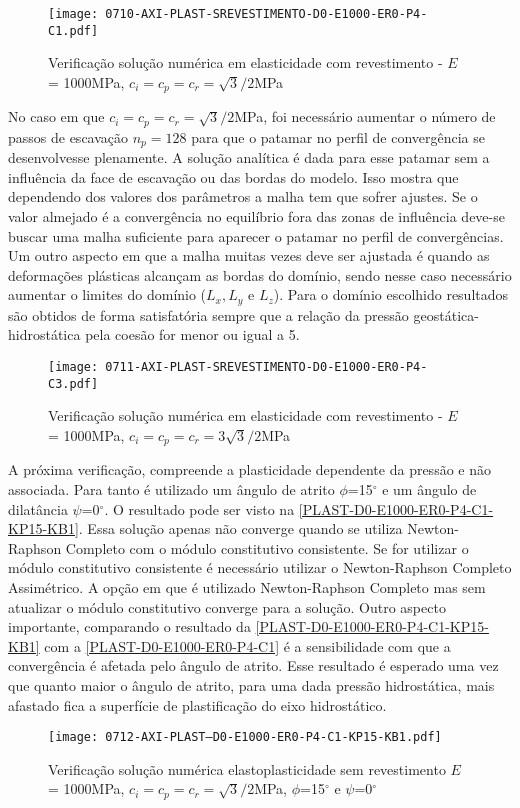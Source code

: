 \begin{figure}[H]
	\begin{center}
		\texttt{[image: 0710-AXI-PLAST-SREVESTIMENTO-D0-E1000-ER0-P4-C1.pdf]}
	\end{center}
	\caption{\label{PLAST-D0-E1000-ER0-P4-C1}Verificação solução numérica em elasticidade com revestimento - $E$ = 1000MPa,  $c_i=c_p=c_r = \sqrt{3}/2$MPa}
\end{figure}
No caso em que $c_i=c_p=c_r = \sqrt{3}/2$MPa, foi necessário aumentar o número de passos de escavação $n_p = 128$ para que o patamar no perfil de convergência se desenvolvesse plenamente. A solução analítica é dada para esse patamar sem a influência da face de escavação ou das bordas do modelo. Isso mostra que dependendo dos valores dos parâmetros a malha tem que sofrer ajustes. Se o valor almejado é a convergência no equilíbrio fora das zonas de influência deve-se buscar uma malha suficiente para aparecer o patamar no perfil de convergências. Um outro aspecto em que a malha muitas vezes deve ser ajustada é quando as deformações plásticas alcançam as bordas do domínio, sendo nesse caso necessário aumentar o limites do domínio ($L_x, L_y$ e $L_z$). Para o domínio escolhido resultados são obtidos de forma satisfatória sempre que a relação da pressão geostática-hidrostática pela coesão for menor ou igual a 5.
\begin{figure}[H]
	\begin{center}
		\texttt{[image: 0711-AXI-PLAST-SREVESTIMENTO-D0-E1000-ER0-P4-C3.pdf]}
	\end{center}
	\caption{\label{PLAST-D0-E1000-ER0-P4-C3}Verificação solução numérica em elasticidade com revestimento - $E$ = 1000MPa, $c_i=c_p=c_r = 3\sqrt{3}/2$MPa}
\end{figure}
 A próxima verificação, compreende a plasticidade dependente da pressão e não associada. Para tanto é utilizado um ângulo de atrito $\phi$=15$^\circ$ e um ângulo de dilatância $\psi$=0$^\circ$. O resultado pode ser visto na \autoref{PLAST-D0-E1000-ER0-P4-C1-KP15-KB1}. Essa solução apenas não converge quando se utiliza Newton-Raphson Completo com o módulo constitutivo consistente. Se for utilizar o módulo constitutivo consistente é necessário utilizar o Newton-Raphson Completo Assimétrico. A opção em que é utilizado Newton-Raphson Completo mas sem atualizar o módulo constitutivo converge para a solução. Outro aspecto importante, comparando o resultado da \autoref{PLAST-D0-E1000-ER0-P4-C1-KP15-KB1} com a \autoref{PLAST-D0-E1000-ER0-P4-C1} é a sensibilidade com que a convergência é afetada pelo ângulo de atrito. Esse resultado é esperado uma vez que quanto maior o ângulo de atrito, para uma dada pressão hidrostática, mais afastado fica a superfície de plastificação do eixo hidrostático.
\begin{figure}[H]
	\begin{center}
		\texttt{[image: 0712-AXI-PLAST--D0-E1000-ER0-P4-C1-KP15-KB1.pdf]}
	\end{center}
	\caption{\label{PLAST-D0-E1000-ER0-P4-C1-KP15-KB1}Verificação solução numérica elastoplasticidade sem revestimento $E$ = 1000MPa, $c_i=c_p=c_r = \sqrt{3}/2$MPa, $\phi$=15$^\circ$ e $\psi$=0$^\circ$}
\end{figure}

